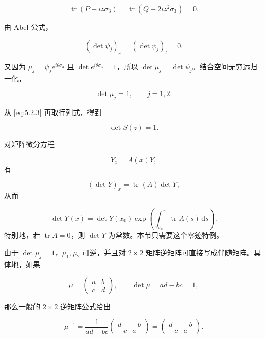 \documentclass[
    lang=cn,
    scheme=chinese,
    mode=simple,
    device=normal,
    color=blue,
    math=cm,
    thmcnt=section,
    12pt,
    nowatermark
]{elegantbook}
\begin{document}
\[
    \operatorname{tr}(P-iz\sigma_3)
    =
    \operatorname{tr}(Q-2iz^2\sigma_3)
    =
    0.
\]

由 Abel 公式，

\begin{equation}
    (\det\psi_j)_x
    =
    (\det\psi_j)_t
    =
    0.
    \tag{5.2.20}
    \label{eq:5.2.20}
\end{equation}

又因为 $\mu_j=\psi_je^{i\theta\sigma_3}$ 且 $\det e^{i\theta\sigma_3}=1$，所以 $\det\mu_j=\det\psi_j$。结合空间无穷远归一化，

\begin{equation}
    \det\mu_j=1,\qquad j=1,2.
    \tag{5.2.21}
    \label{eq:5.2.21}
\end{equation}

从 \eqref{eq:5.2.3} 再取行列式，得到

\[
    \det S(z)=1.
\]

\begin{callout}
    对矩阵微分方程

    \[
        Y_x=A(x)Y,
    \]
    有

    \[
        (\det Y)_x=\operatorname{tr}(A)\det Y,
    \]
    从而

    \[
        \det Y(x)
        =
        \det Y(x_0)
        \exp\!\left(\int_{x_0}^{x}\operatorname{tr}A(s)\,\mathrm ds\right).
    \]
    特别地，若 $\operatorname{tr}A=0$，则 $\det Y$ 为常数。本节只需要这个零迹特例。
\end{callout}

由于 $\det\mu_j=1$，$\mu_1,\mu_2$ 可逆，并且对 $2\times2$ 矩阵逆矩阵可直接写成伴随矩阵。具体地，如果

\[
    \mu=
    \begin{pmatrix}
        a & b \\
        c & d
    \end{pmatrix},
    \qquad
    \det\mu=ad-bc=1,
\]

那么一般的 $2\times2$ 逆矩阵公式给出

\[
    \mu^{-1}
    =
    \dfrac{1}{ad-bc}
    \begin{pmatrix}
        d  & -b \\
        -c & a
    \end{pmatrix}
    =
    \begin{pmatrix}
        d  & -b \\
        -c & a
    \end{pmatrix}.
\]
\end{document}
